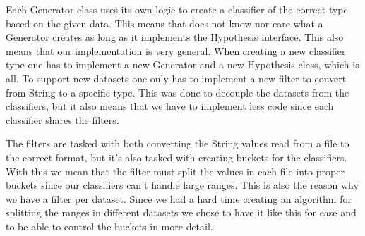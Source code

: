 Each Generator class uses its own logic to create a classifier of the correct type
based on the given data. This means that \adaboost{} does not know nor care what
a Generator creates as long as it implements the Hypothesis interface. This also
means that our implementation is very general. When creating a new classifier type
one has to implement a new Generator and a new Hypothesis class, which is all. To
support new datasets one only has to implement a new filter to convert from String
to a specific type. This was done to decouple the datasets from the classifiers, but
it also means that we have to implement less code since each classifier shares the
filters.

The filters are tasked with both converting the String values read from a file to
the correct format, but it's also tasked with creating buckets for the classifiers.
With this we mean that the filter must split the values in each file into proper
buckets since our classifiers can't handle large ranges. This is also the reason
why we have a filter per dataset. Since we had a hard time creating an algorithm
for splitting the ranges in different datasets we chose to have it like this for ease
and to be able to control the buckets in more detail.
